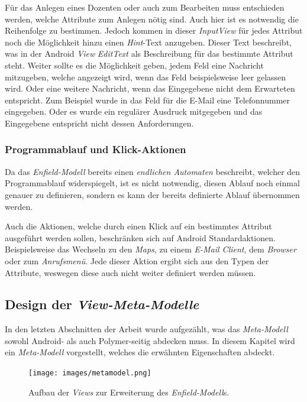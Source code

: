 Für das Anlegen eines Dozenten oder auch zum Bearbeiten muss entschieden werden, welche Attribute zum Anlegen nötig sind. Auch hier ist es notwendig die Reihenfolge zu bestimmen. Jedoch kommen in dieser \textit{InputView} für jedes Attribut noch die Möglichkeit hinzu einen \textit{Hint}-Text anzugeben. Dieser Text beschreibt, was in der Android \textit{View} \textit{EditText} als Beschreibung für das bestimmte Attribut steht. Weiter sollte es die Möglichkeit geben, jedem Feld eine Nachricht mitzugeben, welche angezeigt wird, wenn das Feld beispielsweise leer gelassen wird. Oder eine weitere Nachricht, wenn das Eingegebene nicht dem Erwarteten entspricht. Zum Beispiel wurde in das Feld für die E-Mail eine Telefonnummer eingegeben. Oder es wurde ein regulärer Ausdruck mitgegeben und das Eingegebene entspricht nicht dessen Anforderungen.

\subsubsection{Programmablauf und Klick-Aktionen}

Da das \textit{Enfield-Modell} bereits einen \textit{endlichen Automaten} beschreibt, welcher den Programmablauf widerspiegelt, ist es nicht notwendig, diesen Ablauf noch einmal genauer zu definieren, sondern es kann der bereits definierte Ablauf übernommen werden.

Auch die Aktionen, welche durch einen Klick auf ein bestimmtes Attribut ausgeführt werden sollen, beschränken sich auf Android Standardaktionen. Beispielsweise das Wechseln zu den \textit{Maps}, zu einem \textit{E-Mail Client}, dem \textit{Browser} oder zum \textit{Anrufsmenü}. Jede dieser Aktion ergibt sich aus den Typen der Attribute, weswegen diese auch nicht weiter definiert werden müssen.

\subsection{Design der \textit{View-Meta-Modelle}} \label{sec:resourceViews}

In den letzten Abschnitten der Arbeit wurde aufgezählt, was das \textit{Meta-Modell} sowohl Android- als auch Polymer-seitig abdecken muss. In diesem Kapitel wird ein \textit{Meta-Modell} vorgestellt, welches die erwähnten Eigenschaften abdeckt.


\begin{figure}[H]
	\begin{center}
		\texttt{[image: images/metamodel.png]}
		\caption{Aufbau der \textit{Views} zur Erweiterung des \textit{Enfield-Modell}s.}
		\label{fig:meta-model}
	\end{center}
\end{figure}

